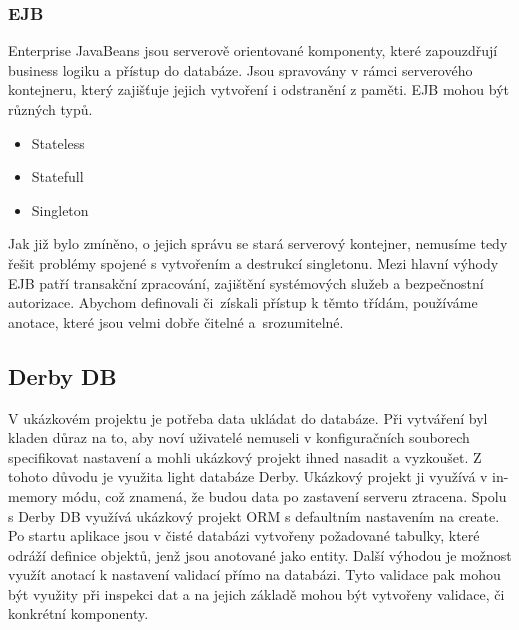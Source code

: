 \subsubsection{EJB}
Enterprise JavaBeans \cite{javaEETutorial} jsou serverově orientované komponenty, které zapouzdřují business logiku a přístup do databáze. Jsou spravovány v rámci serverového kontejneru, který zajišťuje jejich vytvoření i odstranění z paměti. EJB mohou být různých typů.
\begin{itemize}
\item Stateless
\item Statefull
\item Singleton
\end{itemize}
Jak již bylo zmíněno, o jejich správu se stará serverový kontejner, nemusíme tedy řešit problémy spojené s vytvořením a destrukcí singletonu\cite{gamma}. Mezi hlavní výhody EJB patří transakční zpracování, zajištění systémových služeb a bezpečnostní autorizace. Abychom definovali či~získali přístup k těmto třídám, používáme anotace, které jsou velmi dobře čitelné a~srozumitelné.
\subsection{Derby DB}
V ukázkovém projektu je potřeba data ukládat do databáze. Při vytváření byl kladen důraz na to, aby noví uživatelé nemuseli v konfiguračních souborech specifikovat nastavení a mohli ukázkový projekt ihned nasadit a vyzkoušet. Z tohoto důvodu je využita light databáze Derby. Ukázkový projekt ji využívá v in-memory módu, což znamená, že budou data po zastavení serveru ztracena. Spolu s Derby DB využívá ukázkový projekt ORM s defaultním nastavením na create. Po startu aplikace jsou v čisté databázi vytvořeny požadované tabulky, které odráží definice objektů, jenž jsou anotované jako entity. Další výhodou je možnost využít anotací k nastavení validací přímo na databázi. Tyto validace pak mohou být využity při inspekci dat a na jejich základě mohou být vytvořeny validace, či konkrétní komponenty.